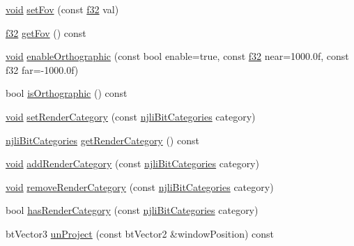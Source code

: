\begin{DoxyCompactItemize}
\mbox{\hyperlink{_thread_8h_af1e856da2e658414cb2456cb6f7ebc66}{void}} \mbox{\hyperlink{classnjli_1_1_camera_a249c6432aa9c8809a92012a272ec6d28}{set\+Fov}} (const \mbox{\hyperlink{_util_8h_a5f6906312a689f27d70e9d086649d3fd}{f32}} val)
\item 
\mbox{\hyperlink{_util_8h_a5f6906312a689f27d70e9d086649d3fd}{f32}} \mbox{\hyperlink{classnjli_1_1_camera_aeca41e2beafd04a8394b9e40599a3222}{get\+Fov}} () const
\item 
\mbox{\hyperlink{_thread_8h_af1e856da2e658414cb2456cb6f7ebc66}{void}} \mbox{\hyperlink{classnjli_1_1_camera_a0421efa372890d9e3a934911a4aeebf1}{enable\+Orthographic}} (const bool enable=true, const \mbox{\hyperlink{_util_8h_a5f6906312a689f27d70e9d086649d3fd}{f32}} near=1000.\+0f, const f32 far=-\/1000.\+0f)
\item 
bool \mbox{\hyperlink{classnjli_1_1_camera_a1aefd1a0cb6c7db25ce429bd632d9f71}{is\+Orthographic}} () const
\item 
\mbox{\hyperlink{_thread_8h_af1e856da2e658414cb2456cb6f7ebc66}{void}} \mbox{\hyperlink{classnjli_1_1_camera_ab5aa8d0d534c0745146ed0d84f72fa18}{set\+Render\+Category}} (const \mbox{\hyperlink{namespacenjli_af7b302a2b48bb644f85c88080925c974}{njli\+Bit\+Categories}} category)
\item 
\mbox{\hyperlink{namespacenjli_af7b302a2b48bb644f85c88080925c974}{njli\+Bit\+Categories}} \mbox{\hyperlink{classnjli_1_1_camera_afb526cf97416d6fcacb48aac9c906134}{get\+Render\+Category}} () const
\item 
\mbox{\hyperlink{_thread_8h_af1e856da2e658414cb2456cb6f7ebc66}{void}} \mbox{\hyperlink{classnjli_1_1_camera_afd4e08b967df5e00190f47ac6579adc6}{add\+Render\+Category}} (const \mbox{\hyperlink{namespacenjli_af7b302a2b48bb644f85c88080925c974}{njli\+Bit\+Categories}} category)
\item 
\mbox{\hyperlink{_thread_8h_af1e856da2e658414cb2456cb6f7ebc66}{void}} \mbox{\hyperlink{classnjli_1_1_camera_a122317f4e5f4fef2331c3bdbb094080d}{remove\+Render\+Category}} (const \mbox{\hyperlink{namespacenjli_af7b302a2b48bb644f85c88080925c974}{njli\+Bit\+Categories}} category)
\item 
bool \mbox{\hyperlink{classnjli_1_1_camera_a7870e48c1f18f0386a2dc7961a94b02e}{has\+Render\+Category}} (const \mbox{\hyperlink{namespacenjli_af7b302a2b48bb644f85c88080925c974}{njli\+Bit\+Categories}} category)
\item 
bt\+Vector3 \mbox{\hyperlink{classnjli_1_1_camera_af43930c16c51df25a5fc743777fbb38f}{un\+Project}} (const bt\+Vector2 \&window\+Position) const

\end{DoxyCompactItemize}
